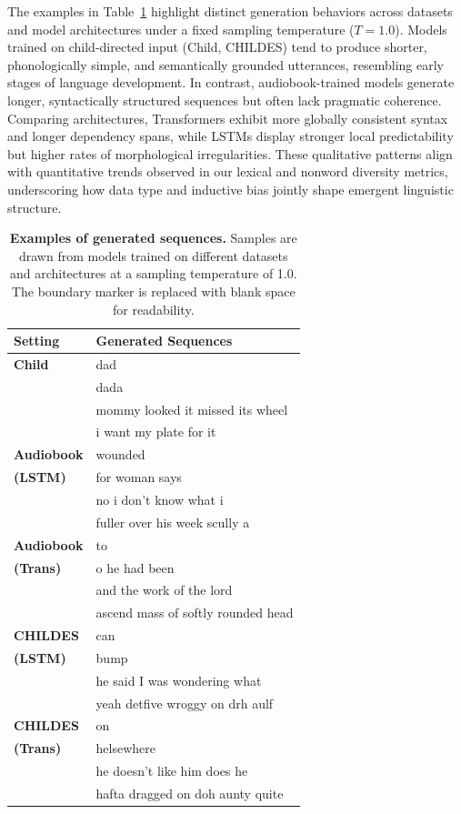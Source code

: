 The examples in Table~\ref{tab:generation-examples} highlight distinct generation behaviors across datasets and model architectures under a fixed sampling temperature ($T=1.0$). Models trained on child-directed input (Child, CHILDES) tend to produce shorter, phonologically simple, and semantically grounded utterances, resembling early stages of language development. In contrast, audiobook-trained models generate longer, syntactically structured sequences but often lack pragmatic coherence. Comparing architectures, Transformers exhibit more globally consistent syntax and longer dependency spans, while LSTMs display stronger local predictability but higher rates of morphological irregularities. These qualitative patterns align with quantitative trends observed in our lexical and nonword diversity metrics, underscoring how data type and inductive bias jointly shape emergent linguistic structure.

\begin{table}[ht]
\centering
\begin{tabular}{ll}
\hline
\textbf{Setting} & \textbf{Generated Sequences} \\
\hline
\textbf{Child} & dad \\
                & dada \\
                & mommy looked it missed its wheel \\
                & i want my plate for it \\
\hline
\textbf{Audiobook}       & wounded \\
\textbf{(LSTM)}          & for woman says \\
                & no i don't know what i \\
                & fuller over his week scully a \\
\hline
\textbf{Audiobook}  & to \\
\textbf{(Trans)}                     & o he had been \\
                     & and the work of the lord \\
                     & ascend mass of softly rounded head \\
\hline
\textbf{CHILDES}          & can \\
\textbf{(LSTM)}               & bump \\
               & he said I was wondering what \\
               & yeah detfive wroggy on drh aulf \\
\hline
\textbf{CHILDES}          & on \\
\textbf{(Trans)}                   & helsewhere \\
                   & he doesn't like him does he \\
                   & hafta dragged on doh aunty quite \\
\hline
\end{tabular}
\caption{\textbf{Examples of generated sequences.} Samples are drawn from models trained on different datasets and architectures at a sampling temperature of 1.0. The boundary marker is replaced with blank space for readability.}
\label{tab:generation-examples}
\end{table}


